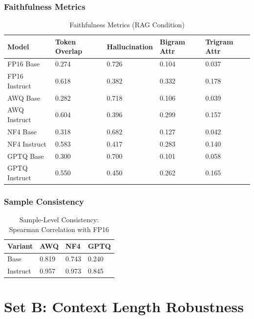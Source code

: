 \documentclass[11pt,a4paper]{article}
\begin{document}
\subsubsection{Faithfulness Metrics}

\begin{table}[H]
\centering
\caption{Faithfulness Metrics (RAG Condition)}
\small
\begin{tabularx}{\textwidth}{@{}X C{2.3cm} C{2.3cm} C{2.3cm} C{2.3cm}@{}}
\toprule
\textbf{Model} & \textbf{Token Overlap} & \textbf{Hallucination} & \textbf{Bigram Attr} & \textbf{Trigram Attr} \\
\midrule
FP16 Base & 0.274 & 0.726 & 0.104 & 0.037 \\
FP16 Instruct & 0.618 & 0.382 & 0.332 & 0.178 \\
AWQ Base & 0.282 & 0.718 & 0.106 & 0.039 \\
AWQ Instruct & 0.604 & 0.396 & 0.299 & 0.157 \\
NF4 Base & 0.318 & 0.682 & 0.127 & 0.042 \\
NF4 Instruct & 0.583 & 0.417 & 0.283 & 0.140 \\
GPTQ Base & 0.300 & 0.700 & 0.101 & 0.058 \\
GPTQ Instruct & 0.550 & 0.450 & 0.262 & 0.165 \\
\bottomrule
\end{tabularx}
\end{table}

\subsubsection{Sample Consistency}

\begin{table}[H]
\centering
\caption{Sample-Level Consistency: Spearman Correlation with FP16}
\begin{tabularx}{\textwidth}{@{}l C{3cm} C{3cm} C{3cm}@{}}
\toprule
\textbf{Variant} & \textbf{AWQ} & \textbf{NF4} & \textbf{GPTQ} \\
\midrule
Base & 0.819 & 0.743 & 0.240 \\
Instruct & 0.957 & 0.973 & 0.845 \\
\bottomrule
\end{tabularx}
\end{table}

\newpage
\section{Set B: Context Length Robustness}
\end{document}
